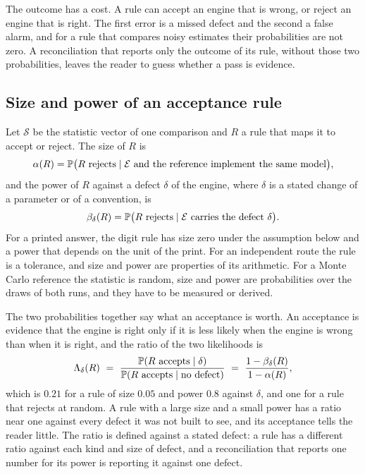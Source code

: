 The outcome has a cost. A rule can accept an engine that is wrong, or reject an engine that is right. The first error is a missed defect and the second a false alarm, and for a rule that compares noisy estimates their probabilities are not zero. A reconciliation that reports only the outcome of its rule, without those two probabilities, leaves the reader to guess whether a pass is evidence.

\subsection{Size and power of an acceptance rule}
\label{sec:problem-size}

Let $\mathcal{S}$ be the statistic vector of one comparison and $R$ a rule that maps it to accept or reject. The size of $R$ is
\begin{equation}
\alpha(R)=\mathbb{P}\big(R\text{ rejects}\mid\mathcal{E}\text{ and the reference implement the same model}\big),
\label{eq:size-def}
\end{equation}
and the power of $R$ against a defect $\delta$ of the engine, where $\delta$ is a stated change of a parameter or of a convention, is
\begin{equation}
\beta_\delta(R)=\mathbb{P}\big(R\text{ rejects}\mid\mathcal{E}\text{ carries the defect }\delta\big).
\label{eq:power-def}
\end{equation}
For a printed answer, the digit rule has size zero under the assumption below and a power that depends on the unit of the print. For an independent route the rule is a tolerance, and size and power are properties of its arithmetic. For a Monte Carlo reference the statistic is random, size and power are probabilities over the draws of both runs, and they have to be measured or derived.

The two probabilities together say what an acceptance is worth. An acceptance is evidence that the engine is right only if it is less likely when the engine is wrong than when it is right, and the ratio of the two likelihoods is
\begin{equation}
\Lambda_\delta(R)\ =\ \frac{\Prob(R\text{ accepts}\mid\delta)}{\Prob(R\text{ accepts}\mid\text{no defect})}\ =\ \frac{1-\beta_\delta(R)}{1-\alpha(R)},
\label{eq:lr-pass}
\end{equation}
which is $0.21$ for a rule of size $0.05$ and power $0.8$ against $\delta$, and one for a rule that rejects at random. A rule with a large size and a small power has a ratio near one against every defect it was not built to see, and its acceptance tells the reader little. The ratio is defined against a stated defect: a rule has a different ratio against each kind and size of defect, and a reconciliation that reports one number for its power is reporting it against one defect.

